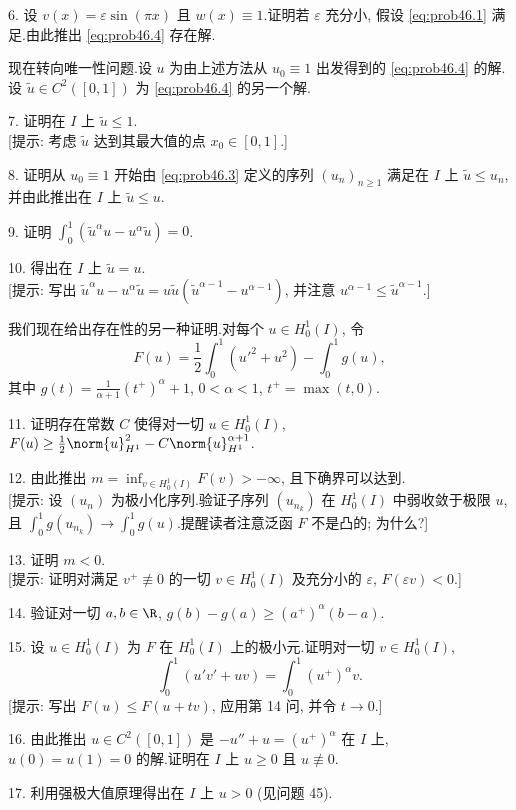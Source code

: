 \begin{problem}
6. 设 $v(x)=\varepsilon\sin(\pi x)$ 且 $w(x)\equiv1$.证明若 $\varepsilon$ 充分小,
假设 \eqref{eq:prob46.1} 满足.由此推出 \eqref{eq:prob46.4} 存在解.

现在转向唯一性问题.设 $u$ 为由上述方法从 $u_0\equiv1$ 出发得到的 \eqref{eq:prob46.4}
的解.设 $\tilde u\in C^2([0,1])$ 为 \eqref{eq:prob46.4} 的另一个解.

7. 证明在 $I$ 上 $\tilde u\le1$.\\
{[提示: 考虑 $\tilde u$ 达到其最大值的点 $x_0\in[0,1]$.]}

8. 证明从 $u_0\equiv1$ 开始由 \eqref{eq:prob46.3} 定义的序列 $(u_n)_{n\ge1}$ 满足在
$I$ 上 $\tilde u\le u_n$, 并由此推出在 $I$ 上 $\tilde u\le u$.

9. 证明 $\int_0^1(\tilde u^\alpha u-u^\alpha\tilde u)=0$.

10. 得出在 $I$ 上 $\tilde u=u$.\\
{[提示: 写出 $\tilde u^\alpha u-u^\alpha\tilde u=u\tilde u(\tilde u^{\alpha-1}-u^{\alpha-1})$,
并注意 $u^{\alpha-1}\le\tilde u^{\alpha-1}$.]}

我们现在给出存在性的另一种证明.对每个 $u\in H_0^1(I)$, 令
\begin{equation*}
F(u)=\frac12\int_0^1(u'^2+u^2)-\int_0^1g(u),
\end{equation*}
其中 $g(t)=\frac{1}{\alpha+1}(t^+)^\alpha+1$, $0<\alpha<1$, $t^+=\max(t,0)$.

11. 证明存在常数 $C$ 使得对一切 $u\in H_0^1(I)$,
$F(u)\ge\frac12\norm{u}_{H^1}^2-C\norm{u}_{H^1}^{\alpha+1}$.

12. 由此推出 $m=\inf_{v\in H_0^1(I)}F(v)>-\infty$, 且下确界可以达到.\\
{[提示: 设 $(u_n)$ 为极小化序列.验证子序列 $(u_{n_k})$ 在 $H_0^1(I)$ 中弱收敛于极限 $u$,
且 $\int_0^1g(u_{n_k})\to\int_0^1g(u)$.提醒读者注意泛函 $F$ 不是凸的; 为什么?]}

13. 证明 $m<0$.\\
{[提示: 证明对满足 $v^+\not\equiv0$ 的一切 $v\in H_0^1(I)$ 及充分小的 $\varepsilon$,
$F(\varepsilon v)<0$.]}

14. 验证对一切 $a,b\in\R$, $g(b)-g(a)\ge(a^+)^\alpha(b-a)$.

15. 设 $u\in H_0^1(I)$ 为 $F$ 在 $H_0^1(I)$ 上的极小元.证明对一切 $v\in H_0^1(I)$,
\begin{equation*}
\int_0^1(u'v'+uv)=\int_0^1(u^+)^\alpha v.
\end{equation*}
[提示: 写出 $F(u)\le F(u+tv)$, 应用第 14 问, 并令 $t\to0$.]

16. 由此推出 $u\in C^2([0,1])$ 是 $-u''+u=(u^+)^\alpha$ 在 $I$ 上, $u(0)=u(1)=0$
的解.证明在 $I$ 上 $u\ge0$ 且 $u\not\equiv0$.

17. 利用强极大值原理得出在 $I$ 上 $u>0$ (见问题 45).
\end{problem}
